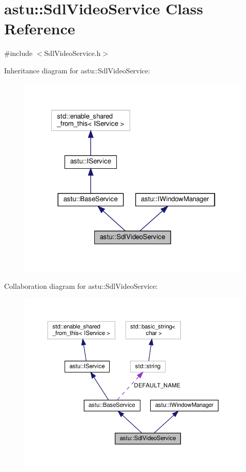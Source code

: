 \hypertarget{classastu_1_1SdlVideoService}{}\section{astu\+:\+:Sdl\+Video\+Service Class Reference}
\label{classastu_1_1SdlVideoService}


{\ttfamily \#include $<$Sdl\+Video\+Service.\+h$>$}



Inheritance diagram for astu\+:\+:Sdl\+Video\+Service\+:\nopagebreak
\begin{figure}[H]
\begin{center}
\leavevmode
\includegraphics[width=322pt]{classastu_1_1SdlVideoService__inherit__graph}
\end{center}
\end{figure}


Collaboration diagram for astu\+:\+:Sdl\+Video\+Service\+:\nopagebreak
\begin{figure}[H]
\begin{center}
\leavevmode
\includegraphics[width=350pt]{classastu_1_1SdlVideoService__coll__graph}
\end{center}
\end{figure}
